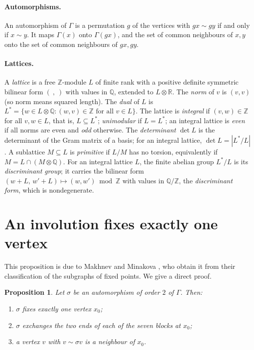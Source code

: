 \documentclass[11pt,a4paper]{article}
\newtheorem{proposition}[theorem]{Proposition}
\theoremstyle{definition}
\theoremstyle{remark}
\newcommand{\ZZ}{\mathbb{Z}}
\newcommand{\QQ}{\mathbb{Q}}
\newcommand{\RR}{\mathbb{R}}
\newcommand{\sg}{\sigma}
\newcommand{\Nb}{\Gamma}
\begin{document}
\paragraph{Automorphisms.} An automorphism of $\Gamma$ is a permutation $g$ of the vertices with $gx\sim gy$ if and
only if $x\sim y$. It maps $\Nb(x)$ onto $\Nb(gx)$, and the set of common neighbours of $x,y$ onto the set of common
neighbours of $gx,gy$.

\paragraph{Lattices.} A \emph{lattice} is a free $\ZZ$-module $L$ of finite rank with a positive definite symmetric
bilinear form $(\ ,\ )$ with values in $\QQ$, extended to $L\otimes\RR$. The \emph{norm} of $v$ is $(v,v)$ (so norm
means squared length). The \emph{dual} of $L$ is $L^*=\{w\in L\otimes\QQ : (w,v)\in\ZZ\text{ for all }v\in L\}$. The
lattice is \emph{integral} if $(v,w)\in\ZZ$ for all $v,w\in L$, that is, $L\subseteq L^*$; \emph{unimodular} if
$L=L^*$; an integral lattice is \emph{even} if all norms are even and \emph{odd} otherwise. The \emph{determinant}
$\det L$ is the determinant of the Gram matrix of a basis; for an integral lattice, $\det L=|L^*/L|$. A sublattice
$M\subseteq L$ is \emph{primitive} if $L/M$ has no torsion, equivalently if $M=L\cap(M\otimes\QQ)$. For an integral
lattice $L$, the finite abelian group $L^*/L$ is its \emph{discriminant group}; it carries the bilinear form
$(w+L,\,w'+L)\mapsto (w,w')\bmod\ZZ$ with values in $\QQ/\ZZ$, the \emph{discriminant form}, which is nondegenerate.

\section{An involution fixes exactly one vertex}\label{sec:fix}

This proposition is due to Makhnev and Minakova \cite{MM}, who obtain it from their classification of the subgraphs of fixed
points. We give a direct proof.

\begin{proposition}\label{prop:fix}
Let $\sg$ be an automorphism of order $2$ of $\Gamma$. Then:
\begin{enumerate}[label=\textup{(\alph*)}]
\item $\sg$ fixes exactly one vertex $x_0$;
\item $\sg$ exchanges the two ends of each of the seven blocks at $x_0$;
\item a vertex $v$ with $v\sim\sg v$ is a neighbour of $x_0$.
\end{enumerate}
\end{proposition}
\end{document}
